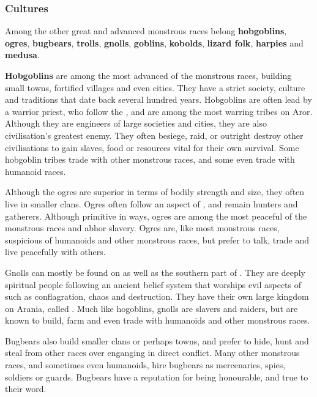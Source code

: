 \subsubsection{Cultures}

Among the other great and advanced monstrous races belong \textbf{hobgoblins},
\textbf{ogres}, \textbf{bugbears}, \textbf{trolls}, \textbf{gnolls},
\textbf{goblins}, \textbf{kobolds}, \textbf{lizard folk}, \textbf{harpies}
and \textbf{medusa}.

\textbf{Hobgoblins} are among the most advanced of the monstrous races,
building small towns, fortified villages and even cities. They have a strict
society, culture and traditions that date back several hundred years. Hobgoblins
are often lead by a warrior priest, who follow the ,
and are among the most warring tribes on Aror. Although they are engineers of
large societies and cities, they are also civilisation's greatest enemy. They
often besiege, raid, or outright destroy other civilisations to gain slaves,
food or resources vital for their own survival. Some hobgoblin tribes trade
with other monstrous races, and some even trade with humanoid races.

Although the ogres are superior in terms of bodily strength and size, they
often live in smaller clans. Ogres often follow an aspect of
, and remain hunters and gatherers. Although primitive
in ways, ogres are among the most peaceful of the monstrous races and abhor
slavery. Ogres are, like most monstrous races, suspicious of humanoids and
other monstrous races, but prefer to talk, trade and live peacefully with
others.

Gnolls can mostly be found on  as well as the southern
part of . They are deeply spiritual people following an
ancient belief system that worships evil aspects of  such
as conflagration, chaos and destruction. They have their own large kingdom on
Arania, called . Much like hogoblins, gnolls are slavers
and raiders, but are known to build, farm and even trade with humanoids and
other monstrous races.

Bugbears also build smaller clans or perhaps towns, and prefer to hide, hunt
and steal from other races over enganging in direct conflict. Many other
monstrous races, and sometimes even humanoids, hire bugbears as mercenaries,
spies, soldiers or guards. Bugbears have a reputation for being honourable,
and true to their word.

